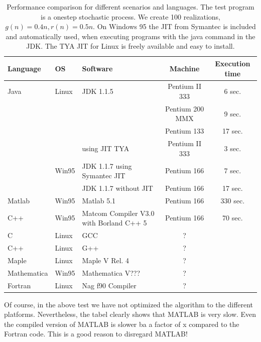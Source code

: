 \begin{table}[htbp]
  \begin{center}
    \leavevmode
    \begin{tabular}{llp{3cm}|c|c}
      Language & OS & Software & Machine & Execution time \\\hline\hline  
      Java & Linux & JDK 1.1.5 & Pentium II 333 & 6 sec. \\\hline
           &       &           & Pentium 200 MMX & 9 sec. \\\hline
           &       &           & Pentium 133 & 17 sec. \\\hline
           &       & using JIT TYA & Pentium II 333 & 3 sec.\\\hline
           & Win95 & JDK 1.1.7 using Symantec JIT & Pentium 166 & 7 sec. \\\hline
           &       & JDK 1.1.7 without JIT & Pentium 166 & 17 sec. \\\hline
   Matlab  & Win95 & Matlab 5.1 & Pentium 166 & 330 sec.\\\hline
   C++     & Win95 & Matcom Compiler V3.0 with Borland C++ 5 & Pentium 166 & 70 sec.\\\hline 
   C       & Linux & GCC & ? & \\\hline
   C++     & Linux & G++ & ? & \\\hline
   Maple   & Linux & Maple V Rel. 4 & ? & \\\hline
Mathematica& Win95 & Mathematica V??? & ? & \\\hline
   Fortran & Linux & Nag f90 Compiler & ? & \\\hline
    \end{tabular}
    \caption{Performance comparison for different scenarios and languages.
      The test program is a onestep stochastic process. We create 100
      realizations, $g(n)=0.4n, r(n)=0.5n$. On Windows 95 the JIT from
      Symantec is included and automatically used, when executing programs
      with the java command in the JDK. The TYA JIT for Linux is freely
      available and easy to install.}
    \label{tab:performance}
  \end{center}
\end{table}


Of course, in the above test we have not optimized the algorithm to the 
different platforms. Nevertheless, the tabel clearly shows that MATLAB is 
very slow. Even the compiled version of MATLAB is slower ba a factor of x 
compared to the Fortran code. This is a good reason to disregard MATLAB!

